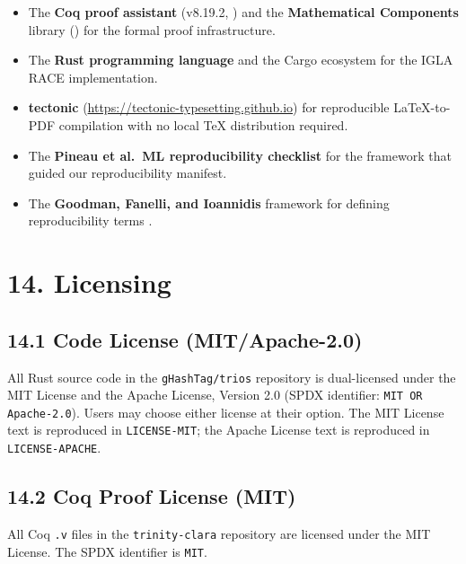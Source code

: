 \begin{itemize}
\item The \textbf{Coq proof assistant} (v8.19.2, \cite{coq_team}) and the
  \textbf{Mathematical Components} library (\cite{bertot_casteran}) for
  the formal proof infrastructure.
\item The \textbf{Rust programming language} and the Cargo ecosystem for
  the IGLA RACE implementation.
\item \textbf{tectonic} (\url{https://tectonic-typesetting.github.io})
  for reproducible LaTeX-to-PDF compilation with no local TeX
  distribution required.
\item The \textbf{Pineau et al.\ ML reproducibility checklist}
  \cite{pineau2021reproducibility} for the framework that guided our
  reproducibility manifest.
\item The \textbf{Goodman, Fanelli, and Ioannidis} framework for
  defining reproducibility terms \cite{goodman2016reproducibility}.
\end{itemize}


\section{14. Licensing}\label{sec:licensing}

\subsection{14.1 Code License (MIT/Apache-2.0)}\label{sec:code-license}

All Rust source code in the \texttt{gHashTag/trios} repository is
dual-licensed under the MIT License and the Apache License, Version 2.0
(SPDX identifier: \texttt{MIT OR Apache-2.0}).  Users may choose either
license at their option.  The MIT License text is reproduced in
\texttt{LICENSE-MIT}; the Apache License text is reproduced in
\texttt{LICENSE-APACHE}.

\subsection{14.2 Coq Proof License (MIT)}\label{sec:coq-license}

All Coq \texttt{.v} files in the \texttt{trinity-clara} repository are
licensed under the MIT License.  The SPDX identifier is \texttt{MIT}.

